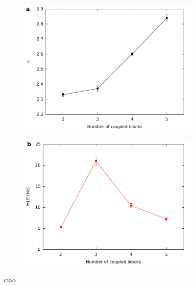 \documentclass[a4paper,11pt,aps,secnumarabic,balancelastpage,amsmath,amssymb,floatfix,table]{article}
\begin{document}
\begin{figure}[H]
    \centering
    \begin{subfigure}{.49\textwidth}
        \includegraphics[width=\linewidth]
        {../data/nu_blocks.pdf}
    \end{subfigure}
    \begin{subfigure}{.49\textwidth}
        \centering
        \includegraphics[width=\linewidth]
        {../data/mle_blocks.pdf}
    \end{subfigure}
    \caption{ciao}
    \label{fig:nu mle blocks}
\end{figure}

\clearpage

\printbibliography
\end{document}
